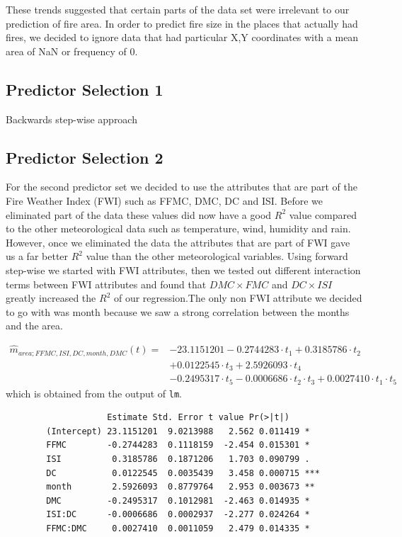 \documentclass{article}
\begin{document}
These trends suggested that certain parts of the data set were irrelevant to our prediction of
fire area. In order to predict fire size in the places that actually had fires, we decided to
ignore data that had particular X,Y coordinates with a mean area of NaN or frequency of 0.

\subsection{Predictor Selection 1}

Backwards step-wise approach

\subsection{Predictor Selection 2}

For the second predictor set we decided to use the attributes that are part of the Fire Weather Index (FWI) such as FFMC, DMC, DC and ISI. 
Before we eliminated part of the data these values did now have a good $R^{2}$ value compared to the other meteorological data such as temperature, wind, humidity and rain. 
However, once we eliminated the data the attributes that are part of FWI gave us a far better $R^{2}$ value than the other meteorological variables. 
Using forward step-wise we started with FWI attributes, then we tested out different interaction terms between FWI attributes and found that $DMC \times FMC$  and $DC \times ISI$ greatly increased the $R^{2}$ of our regression.The only non FWI attribute we decided to go with was month because we saw a strong correlation between the months and the area.

\begin{align*}
  \widehat{m}_{area;FFMC,ISI,DC,month,DMC}(t) = &-23.1151201 - 0.2744283 \cdot t_1 + 0.3185786 \cdot t_2 \\
  &+ 0.0122545 \cdot t_3 + 2.5926093 \cdot t_4 \\
  &- 0.2495317 \cdot t_5 - 0.0006686 \cdot t_2 \cdot t_3 + 0.0027410 \cdot t_1 \cdot t_5 	   
\end{align*}
which is obtained from the output of \verb=lm=.

\begin{verbatim}
              		Estimate Std. Error t value Pr(>|t|)    
		(Intercept) 23.1151201  9.0213988   2.562 0.011419 *  
		FFMC        -0.2744283  0.1118159  -2.454 0.015301 *  
		ISI          0.3185786  0.1871206   1.703 0.090799 .  
		DC           0.0122545  0.0035439   3.458 0.000715 ***
		month        2.5926093  0.8779764   2.953 0.003673 ** 
		DMC         -0.2495317  0.1012981  -2.463 0.014935 *  
		ISI:DC      -0.0006686  0.0002937  -2.277 0.024264 *  
		FFMC:DMC     0.0027410  0.0011059   2.479 0.014335 *
\end{verbatim}
\end{document}
